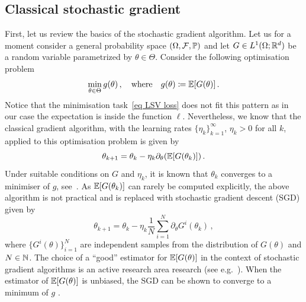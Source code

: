 \subsection{Classical stochastic gradient}
First, let us review the basics of the stochastic gradient algorithm. 
Let us for a moment consider a general probability space $(\Omega, \mathcal{F}, \mathbb{P})$ and let $G\in L^1(\Omega; \mathbb{R}^d)$ be a random variable parametrized by $\theta\in \Theta$. 
Consider the following optimisation problem 
\[
\min_{\theta \in \Theta}g(\theta)\,,\quad\text{where}\quad g(\theta)\coloneqq \mathbb{E}[G(\theta)]\,.
\]
Notice that the minimisation task~\eqref{eq LSV loss} does not fit this pattern as in our case the expectation is inside the function $\ell$. Nevertheless, we know that the classical gradient algorithm, with the learning rates $\{\eta_k\}_{k=1}^{\infty}$, $\eta_k >0$ for all $k$, applied to this optimisation problem is given by
\[
\theta_{k+1} = \theta_k - \eta_k \partial_\theta (\mathbb{E}[G(\theta_k)])\,.
\]
Under suitable conditions on $G$ and $\eta_k$, it is known that $\theta_{k}$ converges to a minimiser of $g$, see~\cite{Benveniste2012AdaptiveApproximations}. 
As $\mathbb{E}[G(\theta_k)]$ can rarely be computed explicitly, the above algorithm is not practical and is replaced with stochastic gradient descent (SGD) given by
\[
\theta_{k+1} = \theta_k - \eta_k \frac{1}{N}\sum_{i=1}^{N} \partial_{\theta}G^i(\theta_k)\,,
\] 
where $\{G^i(\theta)\}_{i=1}^{N}$ are independent samples from the distribution of $G(\theta)$ and $N \in\mathbb{N}$. The choice of a ``good'' estimator for $\mathbb{E}[G(\theta)]$ in the context of stochastic gradient algorithms is an active research area research (see e.g.~\cite{Majka2020Multi-indexAlgorithm}). 
When the estimator of $\mathbb{E}[G(\theta)]$ is unbiased, the SGD can be shown to converge to a minimum of $g$ \cite{Benveniste2012AdaptiveApproximations}. 


